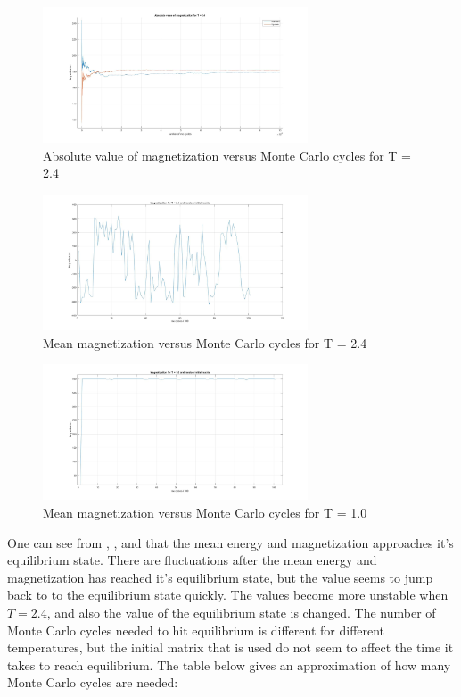 \documentclass[10pt,a4paper]{article}
\begin{document}
\begin{figure}[H]
\centerline{
\includegraphics[width=0.7\textwidth]{absmag24T}
}
\caption{Absolute value of magnetization versus Monte Carlo cycles for T = 2.4}
\label{fig:absmag24T}
\end{figure}
\begin{figure}[H]
\centerline{
\includegraphics[width=0.7\textwidth]{magnetizationT24random}
}
\caption{Mean magnetization versus Monte Carlo cycles for T = 2.4}
\label{fig:mag24T}
\end{figure}
\begin{figure}[H]
\centerline{
\includegraphics[width=0.7\textwidth]{magnetizationT1random}
}
\caption{Mean magnetization versus Monte Carlo cycles for T = 1.0}
\label{fig:mag1T}
\end{figure}

\noindent One can see from , ,  and  that the mean energy and magnetization approaches it's equilibrium state. There are fluctuations after the mean energy and magnetization has reached it's equilibrium state, but the value seems to jump back to to the equilibrium state quickly. The values become more unstable when $T = 2.4$, and also the value of the equilibrium state is changed. The number of Monte Carlo cycles needed to hit equilibrium is different for different temperatures, but the initial matrix that is used do not seem to affect the time it takes to reach equilibrium. The table below gives an approximation of how many Monte Carlo cycles are needed:
\end{document}
